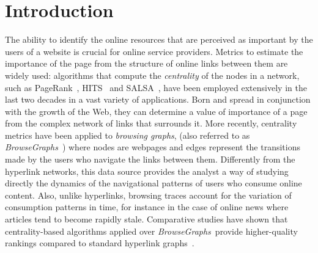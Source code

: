 \documentclass{sig-alternate-2013}
\newcommand{\bgraphs}{\textit{BrowseGraphs}}
\begin{document}
\section{Introduction} \label{sec:introduction} 
The ability to identify the online resources that are perceived as important by the users of a website is crucial for online service providers. Metrics to estimate the importance of the page from the structure of online links between them are widely used: algorithms that compute the \textit{centrality} of the nodes in a network, such as PageRank~\cite{Page1998}, HITS~\cite{Kleinberg1999} and SALSA~\cite{Lempel2001}, have been employed extensively in the last two decades in a vast variety of applications. Born and spread in conjunction with the growth of the Web, they can determine a value of importance of a page from the complex network of links that surrounds it.
% 
More recently, centrality metrics have been applied to \emph{browsing graphs}, (also referred to as \bgraphs\ \cite{Liu2008a,trevisiol12image,TrevisiolRecSys14}) where nodes are webpages and edges represent the transitions made by the users who navigate the links between them. Differently from the hyperlink networks, this data source provides the analyst a way of studying directly the dynamics of the navigational patterns of users who consume online content. Also, unlike hyperlinks, browsing traces account for the variation of consumption patterns in time, for instance in the case of online news where articles tend to become rapidly stale. Comparative studies have shown that centrality-based algorithms applied over \bgraphs\ provide higher-quality rankings compared to standard hyperlink graphs~\cite{Liu2009, Liu2008a}.
\end{document}
